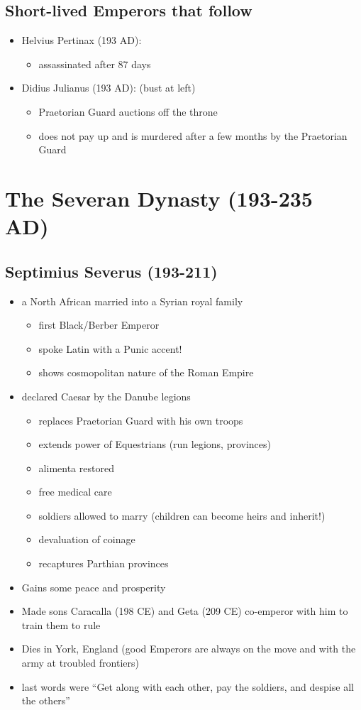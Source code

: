 \documentclass[12pt, twoside]{article}
\begin{document}
\subsection{Short-lived Emperors that follow}
\begin{itemize}
\item Helvius Pertinax (193 AD):
	\begin{itemize}
	\item assassinated after 87 days
	\end{itemize}
\item Didius Julianus (193 AD): (bust at left)
	\begin{itemize}
	\item Praetorian Guard auctions off the throne
	\item does not pay up and is murdered after a few months by the Praetorian Guard
	\end{itemize}
\end{itemize}

\section{The Severan Dynasty (193-235 AD)}
\subsection{Septimius Severus (193-211)}
\begin{itemize}
\item a North  African married into a Syrian royal family
	\begin{itemize}
	\item first Black/Berber Emperor
	\item spoke Latin with a Punic accent!
	\item shows cosmopolitan nature of the Roman Empire
	\end{itemize}
\item declared Caesar by the Danube legions 
	\begin{itemize}
	\item replaces Praetorian Guard with his own troops
	\item extends power of Equestrians (run legions, provinces)
	\item alimenta restored
	\item free medical care
	\item soldiers allowed to marry (children can become heirs and inherit!)
	\item devaluation of coinage
	\item recaptures Parthian provinces
	\end{itemize}
\item Gains some peace and prosperity
\item Made sons Caracalla (198 CE) and Geta (209 CE) co-emperor with him to train them to rule
\item Dies in York, England (good Emperors are always on the move and with the army at troubled frontiers)
\item last words were “Get along with each other, pay the soldiers, and despise all the others”
\end{itemize}
\end{document}
